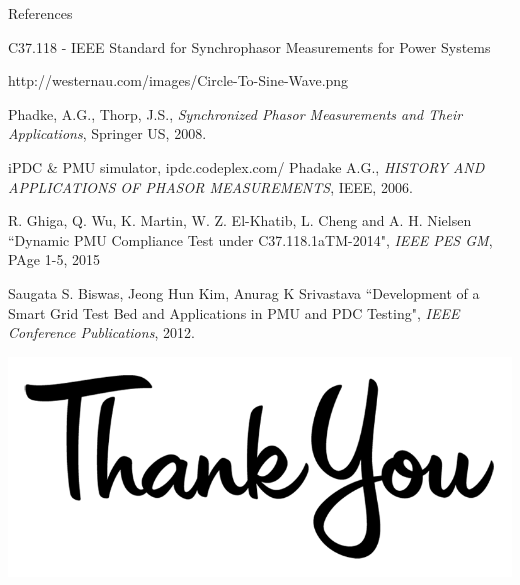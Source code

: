 \documentclass{beamer}
\begin{document}
    \begin{frame}{References}
\begin{thebibliography}{1}
	\tiny
	
	 C37.118 - IEEE Standard for Synchrophasor Measurements for Power Systems
	
	http://westernau.com/images/Circle-To-Sine-Wave.png
	
	Phadke, A.G., Thorp, J.S.,  \textit{Synchronized Phasor Measurements and Their Applications}, Springer US, 2008.
	
	iPDC \& PMU simulator, ipdc.codeplex.com/ 
	Phadake A.G., \textit{HISTORY AND APPLICATIONS OF PHASOR MEASUREMENTS}, IEEE, 2006.
	
	
	R. Ghiga, Q. Wu, K. Martin, W. Z. El-Khatib, L. Cheng and A. H. Nielsen ``Dynamic PMU Compliance Test under C37.118.1aTM-2014", \textit{IEEE PES GM}, PAge 1-5, 2015
	
	Saugata S. Biswas, Jeong Hun Kim, Anurag K Srivastava ``Development of a Smart Grid Test Bed and Applications in PMU and PDC Testing", \textit{IEEE Conference Publications}, 2012.	
	

\end{thebibliography}
    \end{frame}


   \begin{frame}
   \begin{center}
   \includegraphics[scale=0.3]{thanku.png}
   \end{center}
   \end{frame}
\end{document}
